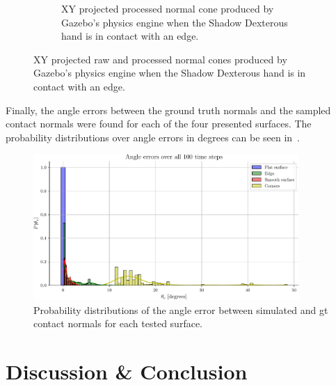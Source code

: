 \begin{figure}[!h]
\begin{subfigure}[b]{0.48\textwidth}
		\caption{XY projected processed normal cone produced by Gazebo's physics engine when the Shadow Dexterous hand is in contact with an edge.}
		\label{fig:xy-projected-processed-normal-cones}
	\end{subfigure}
		\caption{XY projected raw and processed normal cones produced by Gazebo's physics engine when the Shadow Dexterous hand is in contact with an edge.}
		\label{fig:xy-projected-processed-normal-normal-cones}
\end{figure}

Finally, the angle errors  between the ground truth normals  and the sampled contact normals were found for each of the four presented surfaces. The probability distributions over angle errors  in degrees can be seen in~.

\begin{figure}[!h]
	\begin{center}
		\includegraphics[width=0.9\textwidth]{chapters/1-tactile-perception/fig/matplotlib/histogram-normal-errors.pdf}
	\end{center}
	\caption{Probability distributions  of the angle error  between simulated and \gls{gt} contact normals for each tested surface.}
	\label{fig:histogram-normal-errors}
\end{figure}

\newpage
\section{Discussion \& Conclusion}\label{sec:1-tactile-perception-discussion-and-conclusion}

